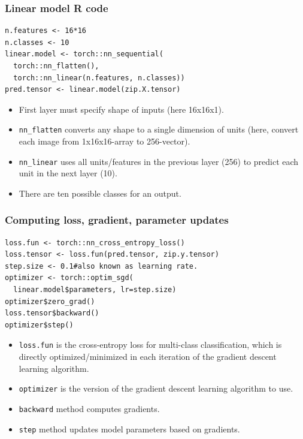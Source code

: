 \documentclass{beamer}
\begin{document}
\begin{frame}[fragile]
  \frametitle{Linear model R code}
\begin{verbatim}
n.features <- 16*16
n.classes <- 10
linear.model <- torch::nn_sequential(
  torch::nn_flatten(),
  torch::nn_linear(n.features, n.classes))
pred.tensor <- linear.model(zip.X.tensor)
\end{verbatim}

  \begin{itemize}
  \item First layer must specify shape of inputs (here 16x16x1).
  \item \texttt{nn\_flatten} converts any shape to a single dimension
    of units (here, convert each image from 1x16x16-array to 256-vector).
  \item \texttt{nn\_linear} uses all units/features in the previous
    layer (256) to predict each unit in the next layer (10).
  \item There are ten possible classes for an output.
  \end{itemize}

\end{frame}

\begin{frame}[fragile]
\frametitle{Computing loss, gradient, parameter updates}
\begin{verbatim}
loss.fun <- torch::nn_cross_entropy_loss()
loss.tensor <- loss.fun(pred.tensor, zip.y.tensor)
step.size <- 0.1#also known as learning rate.
optimizer <- torch::optim_sgd(
  linear.model$parameters, lr=step.size)
optimizer$zero_grad()
loss.tensor$backward()
optimizer$step()
\end{verbatim}
\begin{itemize}
\item \texttt{loss.fun} is the cross-entropy loss for multi-class
  classification, which is directly optimized/minimized in each
  iteration of the gradient descent learning algorithm.
\item \texttt{optimizer} is the version of the gradient descent learning
  algorithm to use.
\item \texttt{backward} method computes gradients.
\item \texttt{step} method updates model parameters based on gradients.
\end{itemize}
\end{frame}
\end{document}
